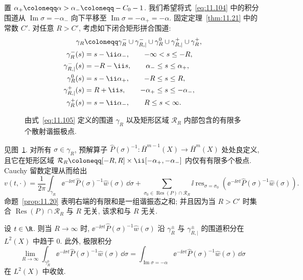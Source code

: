 置 $\alpha_+ \defeq \alpha > \alpha_- \defeq -C_0 - 1$. 我们希望将式~\eqref{eq:11.104} 中的积分围道从 $\operatorname{Im}\sigma = -\alpha_-$ 向下平移至 $\operatorname{Im}\sigma = -\alpha_+ = -\alpha$. 固定定理~\ref{thm:11.21} 中的常数 $C'$. 对任意 $R > C'$, 考虑如下闭合矩形拼合围道:
\begin{equation}\label{eq:11.105}
\begin{aligned}
    \gamma_R &\defeq \gamma_R^- \cup \gamma_{R, |}^- \cup \gamma_R^0 \cup \gamma_{R, |}^+ \cup \gamma_R^+, \\
    \gamma_R^-(s) &= s - \ii \alpha_-, \qquad -\infty < s \le -R, \\
    \gamma_{R, |}^-(s) &= -R - \ii s, \qquad \alpha_- \le s \le \alpha_+, \\
    \gamma_R^0(s) &= s - \ii \alpha_+, \qquad -R \le s \le R, \\
    \gamma_{R, |}^+(s) &= R + \ii s, \qquad -\alpha_+ \le s \le -\alpha_-, \\
    \gamma_R^+(s) &= s - \ii \alpha_-, \qquad R \le s < \infty.
\end{aligned}
\end{equation}

\begin{figure}[htbp]
\centering
\drawFigElevenSix
\caption{由式~\eqref{eq:11.105} 定义的围道 $\gamma_R$ 以及矩形区域 $\mathcal{R}_R$ 内部包含的有限多个散射谐振极点.}\label{fig:11.6}
\end{figure}

见图~\ref{fig:11.6}. 对所有 $\sigma \in \gamma_R$, 预解算子 $\widehat{P}(\sigma)^{-1} \colon \bar H^{m-1}(X) \to \bar H^m(X)$ 处处良定义, 且它在矩形区域 $\mathcal{R}_R \defeq [-R, R] \times \ii[-\alpha_+, -\alpha_-]$ 内仅有有限多个极点. Cauchy 留数定理从而给出
\begin{equation}\label{eq:11.106}
    v(t, \cdot) = \frac{1}{2\pi} \int_{\gamma_R} \ee^{-\ii \sigma t} \widehat{P}(\sigma)^{-1} \hat w(\sigma) \,\dd \sigma + \sum_{\sigma_0 \in \operatorname{Res}(P) \cap \mathcal{R}_R} \ii \operatorname{res}_{\sigma = \sigma_0} \left( \ee^{-\ii \sigma t} \widehat{P}(\sigma)^{-1} \hat w(\sigma) \right).
\end{equation}
命题~\ref{prop:11.20} 表明右端的有限和是一组谐振态之和; 并且因为当 $R > C'$ 时集合 $\operatorname{Res}(P) \cap \mathcal{R}_R$ 与 $R$ 无关, 该求和与 $R$ 无关.

\begin{lemma}[围道积分估计]\label{lem:11.23}
设 $t \in \R$. 则当 $R \to \infty$ 时, $\ee^{-\ii \sigma t} \widehat{P}(\sigma)^{-1} \hat w(\sigma)$ 沿 $\gamma_R^\pm$ 与 $\gamma_{R, |}^\pm$ 的围道积分在 $L^2(X)$ 中趋于 0. 此外, 极限积分
\begin{equation}\label{eq:11.107}
    \lim_{R \to \infty} \int_{\gamma_R^0} \ee^{-\ii \sigma t} \widehat{P}(\sigma)^{-1} \hat w(\sigma) \,\dd \sigma = \int_{\operatorname{Im}\sigma = -\alpha} \ee^{-\ii \sigma t} \widehat{P}(\sigma)^{-1} \hat w(\sigma) \,\dd \sigma
\end{equation}
在 $L^2(X)$ 中收敛.
\end{lemma}

